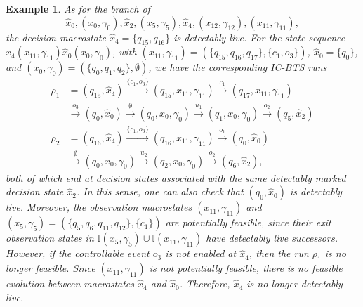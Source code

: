 \documentclass[twocolumn]{autart}
\newtheorem{myexm}{Example}
\begin{document}
\begin{myexm}
As for the branch of 
$$
\hat{x}_{0}, (x_0, \gamma_0), \hat{x}_{2}, (x_5, \gamma_5), \hat{x}_{4}, (x_{12}, \gamma_{12}), (x_{11}, \gamma_{11}),
$$
the decision macrostate $\hat{x}_{4} = \{ q_{15}, q_{16} \}$ is detectably live.
For the state sequence $\hat{x}_{4} (x_{11}, \gamma_{11}) \hat{x}_{0} (x_0, \gamma_0)$, with $(x_{11}, \gamma_{11}) = (\{ q_{15}, q_{16}, q_{17}\}, \{c_1, o_3\})$, $\hat{x}_{0} = \{ q_0 \}$, and $(x_{0}, \gamma_{0}) = (\{ q_0, q_1, q_2 \}, \emptyset)$, we have the corresponding IC-BTS runs
$$
\begin{aligned}
\rho_1 &= 
(q_{15}, \hat{x}_{4}) \xrightarrow{\{c_1, o_3\}} (q_{15}, x_{11}, \gamma_{11}) \xrightarrow{c_1} (q_{17}, x_{11}, \gamma_{11}) \\
&\xrightarrow{o_3} (q_0, \hat{x}_{0}) \xrightarrow{\emptyset} (q_0, x_{0}, \gamma_{0}) \xrightarrow{u_1} (q_1, x_{0}, \gamma_{0}) \xrightarrow{o_2} (q_5, \hat{x}_2) \\
\rho_2 &= 
(q_{16}, \hat{x}_{4}) \xrightarrow{\{c_1, o_3\}} (q_{16}, x_{11}, \gamma_{11}) \xrightarrow{o_1} (q_0, \hat{x}_{0}) \\
&\xrightarrow{\emptyset}  (q_0, x_{0}, \gamma_{0}) \xrightarrow{u_2} (q_2, x_{0}, \gamma_{0}) \xrightarrow{o_2} (q_6, \hat{x}_2),
\end{aligned}
$$
both of which end at decision states associated with the same detectably marked decision state $\hat{x}_{2}$.
In this sense, one can also check that $(q_0, \hat{x}_{0})$ is detectably live.
Moreover, the observation macrostates $(x_{11}, \gamma_{11})$ and $(x_{5}, \gamma_{5}) = (\{q_5, q_6, q_{11}, q_{12}\}, \{ c_1 \})$ are potentially feasible, since their exit observation states in 
$
\mathbb{I}(x_5,\gamma_5)\cup \mathbb{I}(x_{11},\gamma_{11})
$
have detectably live successors.
However, if the controllable event $o_3$ is not enabled at $\hat{x}_{4}$, then the run $\rho_{1}$ is no longer feasible.
Since $(x_{11}, \gamma_{11})$ is not potentially feasible, there is no feasible evolution between macrostates $\hat{x}_4$ and $\hat{x}_0$.
Therefore, $\hat{x}_{4}$ is no longer detectably live.
\end{myexm}
\end{document}
